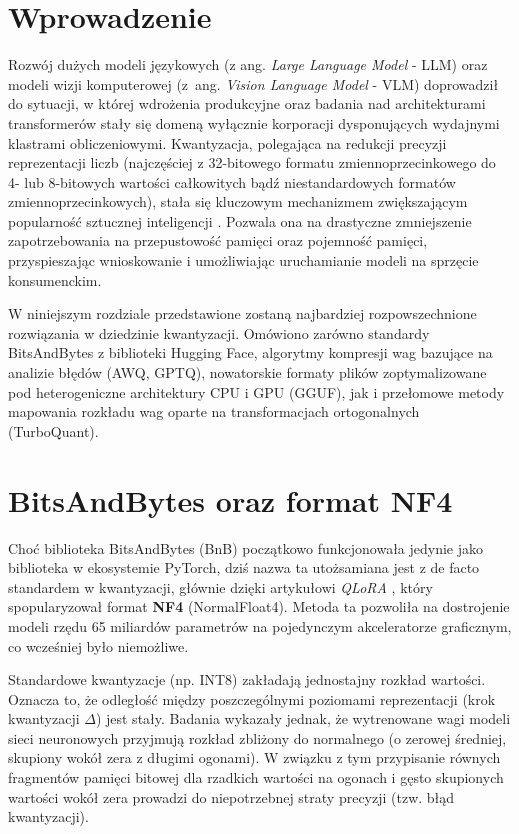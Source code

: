 \section{Wprowadzenie}
Rozwój dużych modeli językowych (z ang. \textit{Large Language Model} - LLM) oraz modeli wizji komputerowej (z~ang. \textit{Vision Language Model} - VLM) doprowadził do sytuacji, w której wdrożenia produkcyjne oraz badania nad architekturami transformerów stały się domeną wyłącznie korporacji dysponujących wydajnymi klastrami obliczeniowymi. Kwantyzacja, polegająca na redukcji precyzji reprezentacji liczb (najczęściej z 32-bitowego formatu zmiennoprzecinkowego do 4- lub 8-bitowych wartości całkowitych bądź niestandardowych formatów zmiennoprzecinkowych), stała się kluczowym mechanizmem zwiększającym popularność sztucznej inteligencji \cite{jacob2017quantization,dettmers2023case4bit}. Pozwala ona na drastyczne zmniejszenie zapotrzebowania na przepustowość pamięci oraz pojemność pamięci, przyspieszając wnioskowanie i umożliwiając uruchamianie modeli na sprzęcie konsumenckim.

W niniejszym rozdziale przedstawione zostaną najbardziej rozpowszechnione rozwiązania w dziedzinie kwantyzacji. Omówiono zarówno standardy BitsAndBytes z biblioteki Hugging Face, algorytmy kompresji wag bazujące na analizie błędów (AWQ, GPTQ), nowatorskie formaty plików zoptymalizowane pod heterogeniczne architektury CPU i GPU (GGUF), jak i przełomowe metody mapowania rozkładu wag oparte na transformacjach ortogonalnych (TurboQuant).

\section{BitsAndBytes oraz format NF4}

Choć biblioteka BitsAndBytes (BnB) początkowo funkcjonowała jedynie jako biblioteka w ekosystemie PyTorch, dziś nazwa ta utożsamiana jest z de facto standardem w kwantyzacji, głównie dzięki artykułowi \textit{QLoRA} \cite{dettmers2023qlora}, który spopularyzował format \textbf{NF4} (NormalFloat4). Metoda ta pozwoliła na dostrojenie modeli rzędu 65 miliardów parametrów na pojedynczym akceleratorze graficznym, co wcześniej było niemożliwe.

Standardowe kwantyzacje (np. INT8) zakładają jednostajny rozkład wartości. Oznacza to, że odległość między poszczególnymi poziomami reprezentacji (krok kwantyzacji $\Delta$) jest stały. Badania wykazały jednak, że wytrenowane wagi modeli sieci neuronowych przyjmują rozkład zbliżony do normalnego (o zerowej średniej, skupiony wokół zera z długimi ogonami). W związku z tym przypisanie równych fragmentów pamięci bitowej dla rzadkich wartości na ogonach i gęsto skupionych wartości wokół zera prowadzi do niepotrzebnej straty precyzji (tzw. błąd kwantyzacji).

